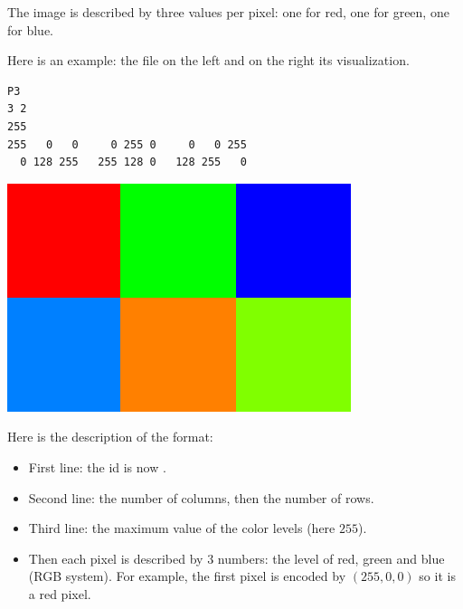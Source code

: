 \documentclass[11pt,class=report,crop=false]{standalone}
\begin{document}
\begin{cours}
The image is described by three values per pixel: one for red, one for green, one for blue.

Here is an example: the file  on the left and on the right its visualization.
\begin{center}
\begin{minipage}{0.6\textwidth}
\begin{lstlisting}
P3
3 2
255
255   0   0     0 255 0     0   0 255
  0 128 255   255 128 0   128 255   0
\end{lstlisting}
\end{minipage}
\begin{minipage}{0.3\textwidth}
\includegraphics[scale=\myscale,scale=0.2]{screen-lesson-image_coul}
\end{minipage}
\end{center}

Here is the description of the format:
\begin{itemize}
  \item First line: the id is now .
  \item Second line: the number of columns, then the number of rows.
  \item Third line: the maximum value of the color levels (here $255$).
  \item Then each pixel is described by $3$ numbers: the level of red, green and blue (RGB system). For example, the first pixel is encoded by $(255,0,0)$ so it is a red pixel.
\end{itemize} 


\end{cours}


\end{document}
